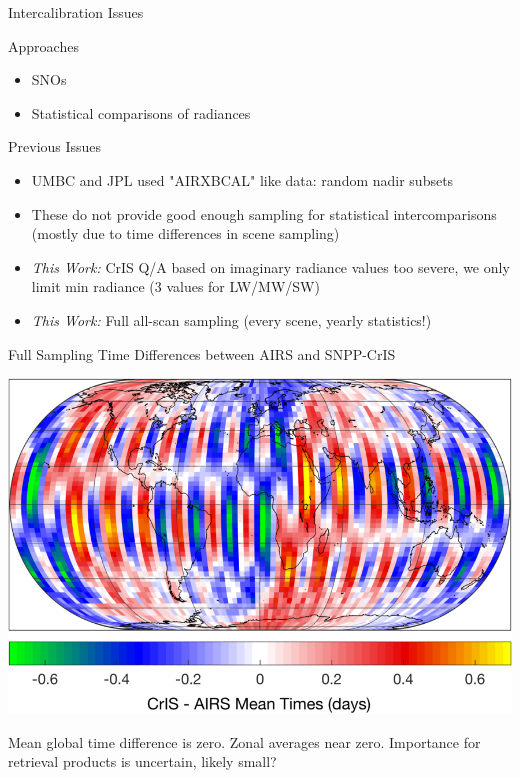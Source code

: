 \documentclass[10pt,t]{beamer}
\begin{document}
\begin{frame}[label={sec:org9f1eae7}]{Intercalibration Issues}
\begin{block}{Approaches}
\begin{itemize}
\item SNOs
\item Statistical comparisons of radiances
\end{itemize}
\end{block}

\begin{block}{Previous Issues}
\begin{itemize}
\item UMBC and JPL used "AIRXBCAL" like data: random nadir subsets
\item These do not provide good enough sampling for statistical intercomparisons (mostly due to time differences in scene sampling)
\item \emph{This Work:} CrIS Q/A based on imaginary radiance values too severe, we only limit min radiance (3 values for LW/MW/SW)
\item \emph{This Work:} Full all-scan sampling (every scene, yearly statistics!)
\end{itemize}
\end{block}
\end{frame}

\begin{frame}[label={sec:org62cd722}]{Full Sampling Time Differences between AIRS and SNPP-CrIS}
\begin{center}
\includegraphics[width=0.8\linewidth]{./Figs/Png/airs_vs_cris_allscan_tdiff_days.png}
\end{center}

Mean global time difference is zero.  Zonal averages near zero.  Importance for retrieval products is uncertain, likely small?
\end{frame}
\end{document}
